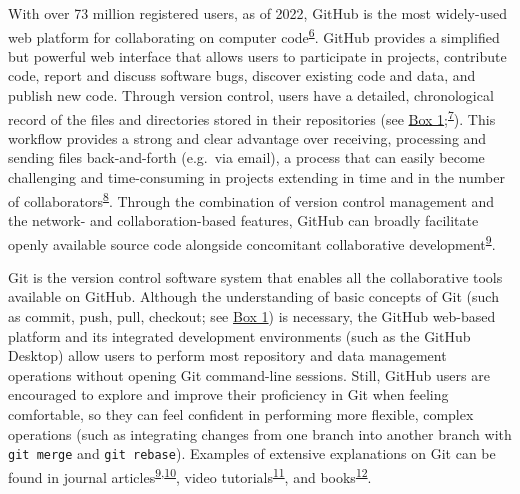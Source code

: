 With over 73 million registered users, as of 2022, GitHub is the most widely-used web platform for collaborating on computer code\textsuperscript{\protect\hyperlink{ref-nwCtHDCn}{6}}.
GitHub provides a simplified but powerful web interface that allows users to participate in projects, contribute code, report and discuss software bugs, discover existing code and data, and publish new code.
Through version control, users have a detailed, chronological record of the files and directories stored in their repositories (see \protect\hyperlink{definitions}{Box 1};\textsuperscript{\protect\hyperlink{ref-RVetqmsg}{7}}).
This workflow provides a strong and clear advantage over receiving, processing and sending files back-and-forth (e.g.~via email), a process that can easily become challenging and time-consuming in projects extending in time and in the number of collaborators\textsuperscript{\protect\hyperlink{ref-4ny1onB0}{8}}.
Through the combination of version control management and the network- and collaboration-based features, GitHub can broadly facilitate openly available source code alongside concomitant collaborative development\textsuperscript{\protect\hyperlink{ref-kEX5dgzK}{9}}.

Git is the version control software system that enables all the collaborative tools available on GitHub.
Although the understanding of basic concepts of Git (such as commit, push, pull, checkout; see \protect\hyperlink{definitions}{Box 1}) is necessary, the GitHub web-based platform and its integrated development environments (such as the GitHub Desktop) allow users to perform most repository and data management operations without opening Git command-line sessions.
Still, GitHub users are encouraged to explore and improve their proficiency in Git when feeling comfortable, so they can feel confident in performing more flexible, complex operations (such as integrating changes from one branch into another branch with \texttt{git\ merge} and \texttt{git\ rebase}). Examples of extensive explanations on Git can be found in journal articles\textsuperscript{\protect\hyperlink{ref-kEX5dgzK}{9},\protect\hyperlink{ref-PlcxShQU}{10}}, video tutorials\textsuperscript{\protect\hyperlink{ref-NIS0JOW0}{11}}, and books\textsuperscript{\protect\hyperlink{ref-13jOlVcpp}{12}}.

